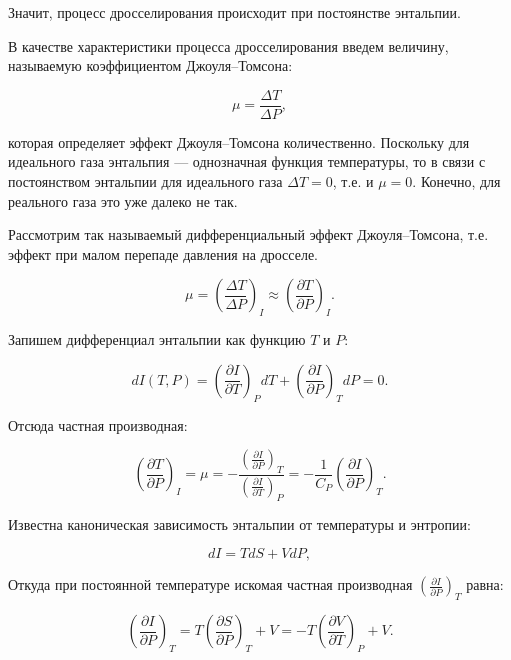 Значит, процесс дросселирования происходит при постоянстве энтальпии. 

В качестве характеристики процесса дросселирования введем величину, называемую коэффициентом Джоуля–Томсона:

\begin{equation}
\mu = \frac{\Delta T}{\Delta P},
\end{equation}

которая определяет эффект Джоуля–Томсона количественно. Поскольку для идеального газа энтальпия — однозначная функция температуры, то в связи с постоянством энтальпии для идеального газа $\Delta T = 0$, т.е. и $\mu = 0$. Конечно, для реального газа это уже далеко не так.

Рассмотрим так называемый дифференциальный эффект Джоуля–Томсона, т.е. эффект при малом перепаде давления на дросселе.

\begin{equation}
\mu = \left( \frac{\Delta T}{\Delta P} \right)_I \approx \left( \frac{\partial T}{\partial P} \right)_I.
\end{equation}

Запишем дифференциал энтальпии как функцию $T$ и $P$:

\begin{equation}
dI(T, P) = \left( \frac{\partial I}{\partial T} \right)_P dT + \left( \frac{\partial I}{\partial P} \right)_T dP = 0.
\end{equation}

Отсюда частная производная:

\begin{equation}
\left( \frac{\partial T}{\partial P} \right)_I = \mu = -\frac{\left( \frac{\partial I}{\partial P} \right)_T}{\left( \frac{\partial I}{\partial T} \right)_P} = -\frac{1}{C_P} \left( \frac{\partial I}{\partial P} \right)_T.
\end{equation}

Известна каноническая зависимость энтальпии от температуры и энтропии:

\begin{equation}
dI = T dS + V dP,
\end{equation}

Откуда при постоянной температуре искомая частная производная $\left( \frac{\partial I}{\partial P} \right)_T$ равна:

\begin{equation}
\left( \frac{\partial I}{\partial P} \right)_T = T \left( \frac{\partial S}{\partial P} \right)_T + V = -T \left( \frac{\partial V}{\partial T} \right)_P + V.
\end{equation}

